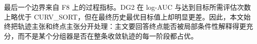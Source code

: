 最后一个边界来自 F8 上的过程指标。DG2 在 log-AUC 与达到目标所需评估次数上略优于 CURV\_SORT，但在最终历史最优目标值上却明显更差。因此，本文始终把轨迹主张和终点主张分开处理：主文要回答终点能否被局部条件性解释得更充分，而不是某个分组器是否在整条收敛轨迹的每一阶段都占优。